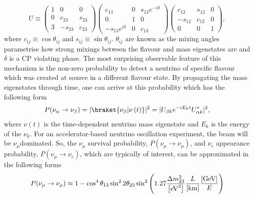 \begin{equation}
U \equiv
\begin{pmatrix}
1 & 0 & 0 \\
0 & c_{23} & s_{23} \\
3 & -s_{23} & c_{23}
\end{pmatrix}
\begin{pmatrix}
c_{13} & 0 & s_{13}e^{-i\delta} \\
0 & 1 & 0 \\
-s_{13}e^{i\delta} & 0 & c_{13} 
\end{pmatrix}
\begin{pmatrix}
c_{12} & s_{12} & 0 \\
-s_{12} & c_{12} & 0 \\
0 & 0 & 1
\end{pmatrix}
,
\label{eq:PMNSMatrix}
\end{equation}
where $c_{ij} \equiv \cos\theta_{ij}$ and $s_{ij} \equiv \sin\theta_{ij}$. $\theta_{ij}$ are known as the mixing angles  parametrise how strong mixings between the flavour and mass eigenstates are and $\delta$ is a CP violating phase.  The most surprising observable feature of this mechanism is the non-zero probability to detect a neutrino of specific flavour which was created at source in a different flavour state.  By propagating the mass eigenstates through time, one can arrive at this probability which has the following form
\begin{equation}
P(\nu_\alpha \rightarrow \nu_\beta) = |\braket{\nu_\beta|\nu\left(t\right)}|^2 = |U_{\beta k} e^{-iE_{k}t}  U^{\ast}_{\alpha k}|^2,
\label{eq:NeutrinoOscillationProbability}
\end{equation}
where $\nu\left(t\right)$ is the time-dependent neutrino mass eigenstate and $E_k$ is the energy of the $\nu_k$.  For an accelerator-based neutrino oscillation experiment, the beam will be $\nu_\mu$dominated.  So, the $\nu_\mu$ survival probability, $P(\nu_\mu \rightarrow \nu_\mu)$, and $\nu_e$ appearance probability, $P(\nu_\mu \rightarrow \nu_e)$, which are typically of interest, can be approximated in the following forms
\begin{equation}
  \Yoshi{P(\nu_\mu \rightarrow \nu_\mu) \approx 1 - \cos^{4}\theta_{13}\sin^{2}2\theta_{23}\sin^2\left(1.27\frac{\Delta m^{2}_{23}}{\left[\textrm{eV}^2\right]}\frac{L}{\left[\textrm{km}\right]}\frac{\left[\textrm{GeV}\right]}{E}\right)}{ADDRESSED - would units not be in square brackets?}
  \label{eq:MuonNeutrinoSurvivalProbability}
\end{equation}
